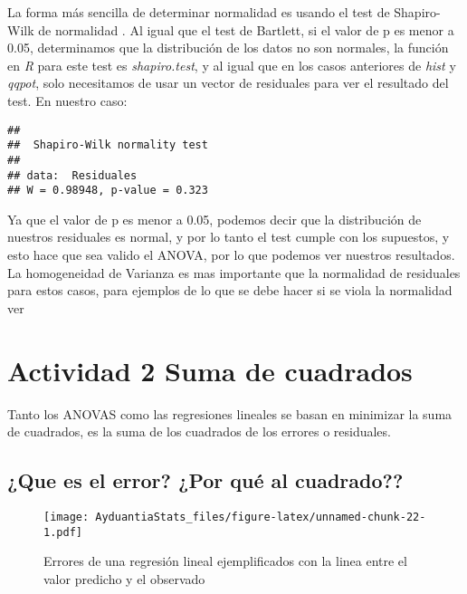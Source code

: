 \documentclass[]{book}
\newenvironment{Shaded}{\begin{snugshade}}{\end{snugshade}}
\newcommand{\KeywordTok}[1]{\textcolor[rgb]{0.13,0.29,0.53}{\textbf{#1}}}
\newcommand{\OperatorTok}[1]{\textcolor[rgb]{0.81,0.36,0.00}{\textbf{#1}}}
\newcommand{\NormalTok}[1]{#1}
\begin{document}
La forma más sencilla de determinar normalidad es usando el test de
Shapiro-Wilk de normalidad \citep{royston1995remark}. Al igual que el
test de Bartlett, si el valor de p es menor a 0.05, determinamos que la
distribución de los datos no son normales, la función en \emph{R} para
este test es \emph{shapiro.test}, y al igual que en los casos anteriores
de \emph{hist} y \emph{qqpot}, solo necesitamos de usar un vector de
residuales para ver el resultado del test. En nuestro caso:

\begin{Shaded}
\end{Shaded}

\begin{verbatim}
## 
##  Shapiro-Wilk normality test
## 
## data:  Residuales
## W = 0.98948, p-value = 0.323
\end{verbatim}

Ya que el valor de p es menor a 0.05, podemos decir que la distribución
de nuestros residuales es normal, y por lo tanto el test cumple con los
supuestos, y esto hace que sea valido el ANOVA, por lo que podemos ver
nuestros resultados. La homogeneidad de Varianza es mas importante que
la normalidad de residuales para estos casos, para ejemplos de lo que se
debe hacer si se viola la normalidad ver \citet{lix1996consequences}

\section{Actividad 2 Suma de
cuadrados}\label{actividad-2-suma-de-cuadrados}

Tanto los ANOVAS como las regresiones lineales se basan en minimizar la
suma de cuadrados, es la suma de los cuadrados de los errores o
residuales.

\subsection{¿Que es el error? ¿Por qué al
cuadrado??}\label{que-es-el-error-por-que-al-cuadrado}

\begin{figure}
\centering
\texttt{[image: AyduantiaStats\_files/figure-latex/unnamed-chunk-22-1.pdf]}
\caption{\label{fig:unnamed-chunk-22}Errores de una regresión lineal
ejemplificados con la linea entre el valor predicho y el observado}
\end{figure}
\end{document}
